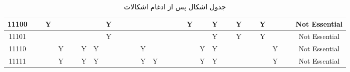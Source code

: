 \begin{table}[H]
\begin{latin}
{\begin{tabular}{|c|c|c|c|c|c|c|c|c|c|c|c|c|c|c|c|c|c|c|c|c|c|c|c|}
		11100 & ~ & Y & ~ & ~ & ~ & ~ & Y & ~ & ~ & ~ & ~ & ~ & ~ & Y & ~ & Y & ~ & Y & ~ & Y & ~ & ~ & Not Essential \\ \hline
		11101 & ~ & ~ & ~ & ~ & ~ & ~ & Y & ~ & ~ & ~ & ~ & ~ & ~ & ~ & ~ & Y & ~ & Y & ~ & Y & ~ & ~ & Not Essential \\ \hline
		11110 & ~ & ~ & Y & ~ & Y & Y & ~ & ~ & ~ & Y & ~ & ~ & ~ & ~ & Y & Y & ~ & ~ & ~ & ~ & Y & ~ & Not Essential \\ \hline
		11111 & ~ & ~ & Y & ~ & Y & Y & ~ & ~ & ~ & Y & Y & ~ & ~ & ~ & Y & Y & ~ & ~ & ~ & ~ & Y & ~ & Not Essential \\ \hline
	\end{tabular}
}
\end{latin}
\caption{جدول اشکال  پس از ادغام اشکالات}
\end{table}